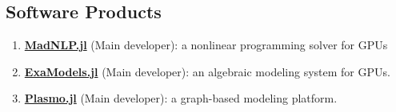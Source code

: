 \documentclass[letterpaper, 11pt]{article}
\begin{document}


\subsection*{Software Products}
\begin{enumerate}[itemsep=1pt, parsep=0pt]
\renewcommand*{\labelenumi}{[S\theenumi]}
\item {\bf \href{https://github.com/MadNLP/MadNLP.jl}{MadNLP.jl}} (Main developer): a nonlinear programming solver for GPUs
\item {\bf \href{https://github.com/exanauts/ExaModels.jl}{ExaModels.jl}} (Main developer): an algebraic modeling system for GPUs.
\item {\bf \href{https://github.com/plasmo-dev/Plasmo.jl}{Plasmo.jl}} (Main developer): a graph-based modeling platform.
\end{enumerate}
\end{document}
